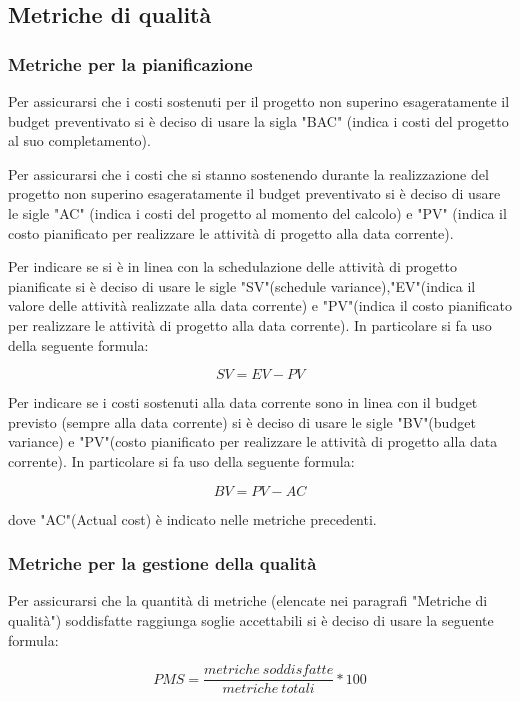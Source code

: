 \subsection{Metriche di qualità}
\subsubsection{Metriche per la pianificazione}
Per assicurarsi che i costi sostenuti per il progetto non superino esageratamente il budget preventivato si è deciso di usare la sigla "BAC" (indica i costi del progetto al suo completamento).

Per assicurarsi che i costi che si stanno sostenendo durante la realizzazione del progetto non superino esageratamente il budget preventivato si è deciso di usare le sigle "AC" (indica i costi del progetto al momento del calcolo) e "PV" (indica il costo pianificato per realizzare le attività di progetto alla data corrente).


Per indicare se si è in linea con la schedulazione delle attività di progetto pianificate si è deciso di usare le sigle "SV"(schedule variance),"EV"(indica il valore delle attività realizzate alla data corrente) e "PV"(indica il costo pianificato per realizzare le attività di progetto alla data corrente). In particolare si fa uso della seguente formula:
\begin{center}
\[SV=EV-PV\]
\end{center}

Per indicare se i costi sostenuti alla data corrente sono in linea con il budget previsto (sempre alla data corrente) si è deciso di usare le sigle "BV"(budget variance) e "PV"(costo pianificato per realizzare le attività di progetto alla data corrente).  In particolare si fa uso della seguente formula:
\begin{center}
\[BV=PV-AC\]
\end{center}
dove "AC"(Actual cost) è indicato nelle metriche precedenti.

\subsubsection{Metriche per la gestione della qualità}
Per assicurarsi che la quantità di metriche (elencate nei paragrafi "Metriche di qualità")  soddisfatte raggiunga soglie accettabili si è deciso di usare la seguente formula:
\begin{center}
\[PMS=\frac{metriche \ soddisfatte}{metriche \ totali}*100\]
\end{center}

